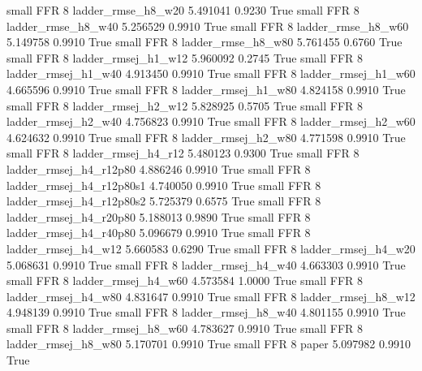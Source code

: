      small      FFR                 8       ladder_rmse_h8_w20   5.491041      0.9230    True
     small      FFR                 8       ladder_rmse_h8_w40   5.256529      0.9910    True
     small      FFR                 8       ladder_rmse_h8_w60   5.149758      0.9910    True
     small      FFR                 8       ladder_rmse_h8_w80   5.761455      0.6760    True
     small      FFR                 8      ladder_rmsej_h1_w12   5.960092      0.2745    True
     small      FFR                 8      ladder_rmsej_h1_w40   4.913450      0.9910    True
     small      FFR                 8      ladder_rmsej_h1_w60   4.665596      0.9910    True
     small      FFR                 8      ladder_rmsej_h1_w80   4.824158      0.9910    True
     small      FFR                 8      ladder_rmsej_h2_w12   5.828925      0.5705    True
     small      FFR                 8      ladder_rmsej_h2_w40   4.756823      0.9910    True
     small      FFR                 8      ladder_rmsej_h2_w60   4.624632      0.9910    True
     small      FFR                 8      ladder_rmsej_h2_w80   4.771598      0.9910    True
     small      FFR                 8      ladder_rmsej_h4_r12   5.480123      0.9300    True
     small      FFR                 8   ladder_rmsej_h4_r12p80   4.886246      0.9910    True
     small      FFR                 8 ladder_rmsej_h4_r12p80s1   4.740050      0.9910    True
     small      FFR                 8 ladder_rmsej_h4_r12p80s2   5.725379      0.6575    True
     small      FFR                 8   ladder_rmsej_h4_r20p80   5.188013      0.9890    True
     small      FFR                 8   ladder_rmsej_h4_r40p80   5.096679      0.9910    True
     small      FFR                 8      ladder_rmsej_h4_w12   5.660583      0.6290    True
     small      FFR                 8      ladder_rmsej_h4_w20   5.068631      0.9910    True
     small      FFR                 8      ladder_rmsej_h4_w40   4.663303      0.9910    True
     small      FFR                 8      ladder_rmsej_h4_w60   4.573584      1.0000    True
     small      FFR                 8      ladder_rmsej_h4_w80   4.831647      0.9910    True
     small      FFR                 8      ladder_rmsej_h8_w12   4.948139      0.9910    True
     small      FFR                 8      ladder_rmsej_h8_w40   4.801155      0.9910    True
     small      FFR                 8      ladder_rmsej_h8_w60   4.783627      0.9910    True
     small      FFR                 8      ladder_rmsej_h8_w80   5.170701      0.9910    True
     small      FFR                 8                    paper   5.097982      0.9910    True
